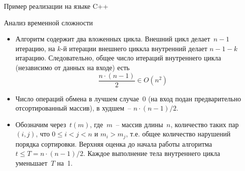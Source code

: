 \documentclass[landscape]{slides}
\begin{document}
\begin{slide}
  Пример реализации на языке C++
  
\end{slide}

\begin{slide}
  Анализ временной сложности
  \begin{itemize}
    \item Алгоритм содержит два вложенных цикла. Внешний цикл делает~$n-1$ итерацию, на $k$-й итерации внешнего циккла
      внутренний делает $n-1-k$ итарацию. Следовательно, общее число итераций внутреннего цикла (независимо от данных
      на входе) есть
      \[
        \frac{n\cdot(n-1)}{2} \in O(n^2)
      \]
    \item Число операций обмена в лучшем случае~0 (на вход подан предварительно отсортированный массив), в
      худшем~-- $n\cdot(n-1)/2$. 
    \item Обозначим через~$t(m)$, где~$m$~-- массив длины~$n$, количество таких пар $(i,j)$, что
      $0\leqslant i< j<n$ и $m_i>m_j$, т.е. общее количество нарушений порядка сортировки. Верхняя оценка до начала
      работы алгоритма $t\leqslant T=n\cdot(n-1)/2$. Каждое выполнение тела внутреннего цикла уменьшает~$T$ на~1.
  \end{itemize}
\end{slide}
\end{document}
